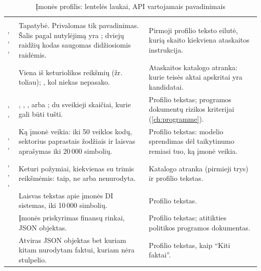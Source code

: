 \begin{xltabular}{\textwidth}{@{}L{37mm}YL{44mm}@{}}
\caption{Įmonės profilis: lentelės  laukai, API vartojamais pavadinimais}\label{tab:company:profile}\\
\toprule
{} &  &  \\
\midrule
\endfirsthead
\toprule
{} &  &  \\
\midrule
\endhead
\bottomrule
\endlastfoot
{}, , ,  &
  Tapatybė. Privalomas tik pavadinimas. Šalis pagal nutylėjimą yra ; dviejų raidžių
  kodas saugomas didžiosiomis raidėmis. &
  Pirmoji profilio teksto eilutė, kurią skaito kiekviena ataskaitos instrukcija. \\
 &
  Viena iš keturiolikos reikšmių (žr. toliau); , kol niekas nepasako. &
  Ataskaitos katalogo atranka: kurie teisės aktai apskritai yra kandidatai. \\
, ,  &
  , , ,  arba ; du sveikieji
  skaičiai, kurie gali būti tušti. &
  Profilio tekstas; programos dokumentų rizikos kriterijai (\cref{ch:programme}). \\
, ,  &
  Ką įmonė veikia: iki 50 veiklos kodų, sektorius paprastais žodžiais ir laisvas aprašymas iki
  20\,000 simbolių. &
  Profilio tekstas: modelio sprendimas dėl taikytinumo remiasi tuo, ką įmonė veikia. \\
, , ,  &
  Keturi požymiai, kiekvienas su trimis reikšmėmis: taip, ne arba nenurodyta. &
  Katalogo atranka (pirmieji trys) ir profilio tekstas. \\
 &
  Laisvas tekstas apie įmonės DI sistemas, iki 10\,000 simbolių. &
  Profilio tekstas. \\
 &
  Įmonės priskyrimas finansų rinkai, JSON objektas. &
  Profilio tekstas; atitikties politikos programos dokumentas. \\
 &
  Atviras JSON objektas bet kuriam kitam nurodytam faktui, kuriam nėra stulpelio. &
  Profilio tekstas, kaip \enquote{Kiti faktai}. \\
\end{xltabular}


